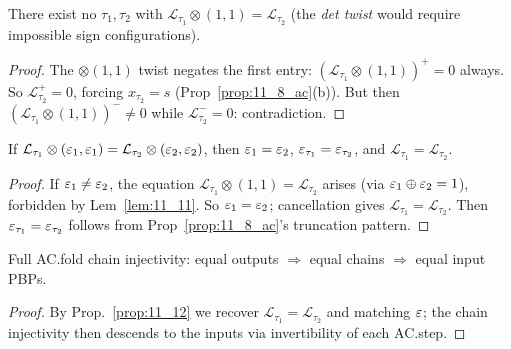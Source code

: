 \begin{lemma}
  \label{lem:11_11}
  \leanok
  There exist no $\tau_1, \tau_2$ with $\mathcal{L}_{\tau_1} \otimes (1, 1) = \mathcal{L}_{\tau_2}$ (the \emph{det twist} would require impossible sign configurations).
\end{lemma}

\begin{proof}
  \leanok
  The $\otimes(1, 1)$ twist negates the first entry: $(\mathcal{L}_{\tau_1} \otimes (1, 1))^+ = 0$ always. So $\mathcal{L}_{\tau_2}^+ = 0$, forcing $x_{\tau_2} = s$ (Prop~\ref{prop:11_8_ac}(b)). But then $(\mathcal{L}_{\tau_1} \otimes (1, 1))^- \neq 0$ while $\mathcal{L}_{\tau_2}^- = 0$: contradiction.
\end{proof}

\begin{proposition}
  \label{prop:11_12}
  \leanok
  If $\mathcal{L}_{\tau_1} \otimes (\varepsilon_1, \varepsilon_1) = \mathcal{L}_{\tau_2} \otimes (\varepsilon_2, \varepsilon_2)$,
  then $\varepsilon_1 = \varepsilon_2$, $\varepsilon_{\tau_1} = \varepsilon_{\tau_2}$, and $\mathcal{L}_{\tau_1} = \mathcal{L}_{\tau_2}$.
\end{proposition}

\begin{proof}
  \leanok
  If $\varepsilon_1 \neq \varepsilon_2$, the equation $\mathcal{L}_{\tau_1} \otimes (1, 1) = \mathcal{L}_{\tau_2}$ arises (via $\varepsilon_1 \oplus \varepsilon_2 = 1$), forbidden by Lem~\ref{lem:11_11}. So $\varepsilon_1 = \varepsilon_2$; cancellation gives $\mathcal{L}_{\tau_1} = \mathcal{L}_{\tau_2}$. Then $\varepsilon_{\tau_1} = \varepsilon_{\tau_2}$ follows from Prop~\ref{prop:11_8_ac}'s truncation pattern.
\end{proof}

\begin{proposition}
  \label{prop:11_13}
  \leanok
  Full AC.fold chain injectivity: equal outputs $\Rightarrow$ equal chains $\Rightarrow$ equal input PBPs.
\end{proposition}
\begin{proof}
  \leanok
  By Prop.~\ref{prop:11_12} we recover $\mathcal{L}_{\tau_1} = \mathcal{L}_{\tau_2}$ and matching $\varepsilon$; the chain injectivity then descends to the inputs via invertibility of each AC.step.
\end{proof}


